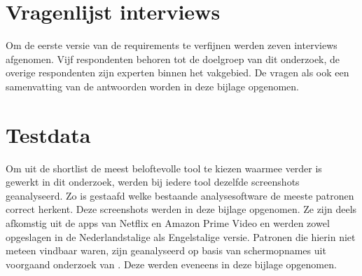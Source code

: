 \documentclass[dutch,dit,thesis]{hogentreport}
\begin{document}



%


\chapter{Vragenlijst interviews}
\label{ch:interviewvragen}

Om de eerste versie van de requirements te verfijnen werden zeven interviews afgenomen. Vijf respondenten behoren tot de doelgroep van dit onderzoek, de overige respondenten zijn experten binnen het vakgebied. De vragen als ook een samenvatting van de antwoorden worden in deze bijlage opgenomen.



\chapter{Testdata}
\label{ch:testdata}

Om uit de shortlist de meest beloftevolle tool te kiezen waarmee verder is gewerkt in dit onderzoek, werden bij iedere tool dezelfde screenshots geanalyseerd. Zo is gestaafd welke bestaande analysesoftware de meeste patronen correct herkent. Deze screenshots werden in deze bijlage opgenomen. Ze zijn deels afkomstig uit de apps van Netflix en Amazon Prime Video en werden zowel opgeslagen in de Nederlandstalige als Engelstalige versie. Patronen die hierin niet meteen vindbaar waren, zijn geanalyseerd op basis van schermopnames uit voorgaand onderzoek van \textcite{Nygren2024}. Deze werden eveneens in deze bijlage opgenomen.






\backmatter{}

\setlength\bibitemsep{2pt} %
\printbibliography[heading=bibintoc]
\end{document}
